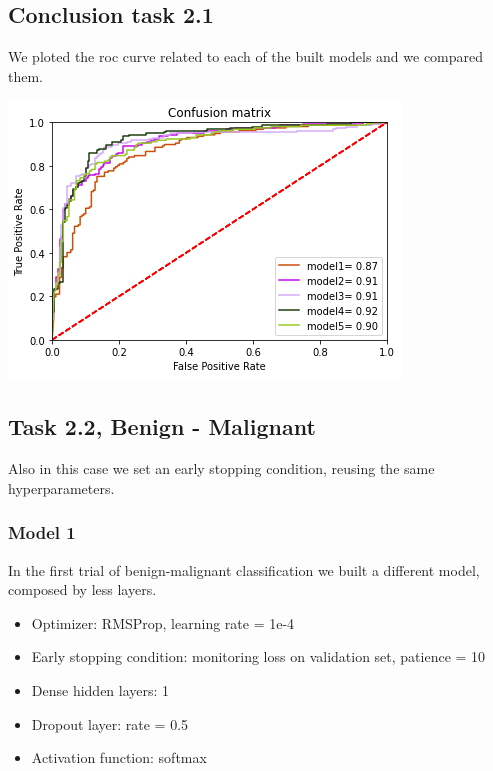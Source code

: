 \documentclass{article}
\begin{document}
\subsection{Conclusion task 2.1}
We ploted the roc curve related to each of the built models and we compared them.
\begin{center}
\begin{minipage}{0.45\textwidth}
        \includegraphics[scale=0.6]{./img/rocScratch.png}
    \end{minipage}
\end{center}


\clearpage
\subsection{Task 2.2, Benign - Malignant}
Also in this case we set an early stopping condition, reusing the same hyperparameters.

\subsubsection{Model 1}
In the first trial of benign-malignant classification we built a different model, composed by less layers.

\begin{itemize}
\item Optimizer: RMSProp, learning rate = 1e-4
\item Early stopping condition: monitoring loss on validation set, patience = 10
\item Dense hidden layers: 1
\item Dropout layer: rate = 0.5
\item Activation function: softmax
\end{itemize}
\end{document}
